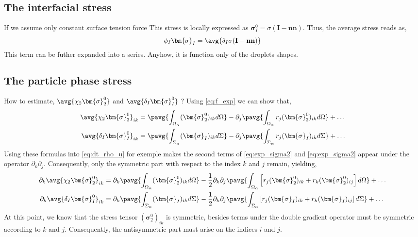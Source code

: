 \subsection{The interfacial stress}
If we assume only constant surface tension force This stress is locally expressed as $\bm{\sigma}_I^0 = \sigma (\textbf{I} - \textbf{nn})$. 
Thus, the average stress reads as, 
\begin{equation}
    \phi_I \bm{\sigma}_I 
    = \avg{\delta_I \sigma (\textbf{I} - \textbf{nn})}
\end{equation}
This term can be futher expanded into a series. 
Anyhow, it is function only of the droplets shapes. 

\subsection{The particle phase stress}
How to estimate, $\avg{\chi_2 \bm{\sigma}_2^0}$ and $\avg{\delta_I \bm{\sigma}_I^0}$ ? 
Using \ref{eq:f_exp} we can show that,
\begin{align}
    \label{eq:exp_sigma2}
    \avg{\chi_2\bm{\sigma}_2^0}_{ik}
    &=  \pavg{\int_{\Omega_\alpha} (\bm{\sigma}_2^0)_{ik} d\Omega}
    - \partial_j
    \pavg{\int_{\Omega_\alpha} r_j(\bm{\sigma}_2^0)_{ik} d\Omega}        
    + \ldots  \\
    \label{eq:exp_sigmaI}
    \avg{\delta_I \bm{\sigma}_I^0}_{ik} 
    &=  \pavg{\int_{\Sigma_\alpha} (\bm{\sigma}_I)_{ik} d\Sigma}        
        - \partial_j \pavg{\int_{\Sigma_\alpha} r_j (\bm{\sigma}_I)_{ik} d\Sigma}
        + \ldots  
\end{align}
Using these formulas into \ref{eq:dt_rho_u} for exemple makes the second terms of \ref{eq:exp_sigma2} and \ref{eq:exp_sigma2} appear under the operator $\partial_k \partial_j$.
Consequently, only the symmetric part with respect to the index $k$ and $j$ remain, yielding, 
\begin{align}
    \partial_k \avg{\chi_2\bm{\sigma}_2^0}_{ik}
    &=  \partial_k \pavg{\int_{\Omega_\alpha} (\bm{\sigma}_2^0)_{ik} d\Omega}
    - \frac{1}{2}\partial_k \partial_j
    \pavg{\int_{\Omega_\alpha} \left[ r_j(\bm{\sigma}_2^0)_{ik}+r_k(\bm{\sigma}_2^0)_{ij} \right]d\Omega}
    + \ldots  \\
    \partial_k\avg{\delta_I \bm{\sigma}_I^0}_{ik} 
    &=  \partial_k\pavg{\int_{\Sigma_\alpha} (\bm{\sigma}_I)_{ik} d\Sigma}        
        - \frac{1}{2}\partial_k\partial_j \pavg{\int_{\Sigma_\alpha} \left[ r_j (\bm{\sigma}_I)_{ik}+r_k (\bm{\sigma}_I)_{ij} \right] d\Sigma}
        + \ldots  
\end{align}
At this point, we know that the stress tensor $(\bm{\sigma}_2^0)_{ik}$ is symmetric, besides terms under the double gradient operator must be symmetric according to $k$ and $j$. 
Consequently, the antisymmetric part must arise on the indices $i$ and $j$.

